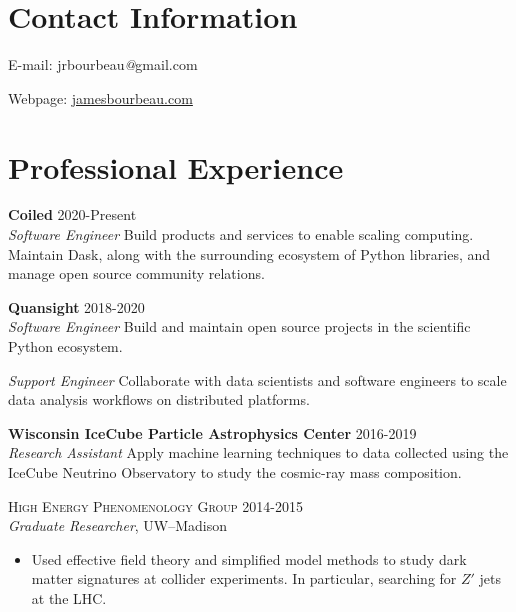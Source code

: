 \documentclass[line,margin]{res}
\begin{document}

\begin{resume}

\section{\sc Contact Information}

E-mail: jrbourbeau{\emph{@}}gmail.com

Webpage: \href{https://jamesbourbeau.com}{jamesbourbeau.com}



\section{\sc Professional Experience}
	\textbf{Coiled} \hfill 2020-Present \\
	{\it Software Engineer}
	\newline
	Build products and services to enable scaling computing.
	Maintain Dask, along with the surrounding ecosystem of Python libraries,
	and manage open source community relations.

	\textbf{Quansight}  \hfill 2018-2020 \\
	{\it Software Engineer}
	\newline
	Build and maintain open source projects in the scientific Python ecosystem.

	{\it Support Engineer}
	\newline
	Collaborate with data scientists and software engineers to scale data analysis workflows on distributed platforms.

	\textbf{Wisconsin IceCube Particle Astrophysics Center}  \hfill 2016-2019 \\
	{\it Research Assistant}
	\newline
	Apply machine learning techniques to data collected using the IceCube Neutrino Observatory to study the cosmic-ray mass composition.


\iffalse
	\textsc{High Energy Phenomenology Group}  \hfill 2014-2015 \\
	{\it Graduate Researcher}, UW--Madison
		\begin{itemize}
		\item Used effective field theory and simplified model methods to study dark matter signatures at collider experiments. In particular, searching for $Z'$ jets at the LHC.
		\end{itemize}



\end{resume}
\end{document}
